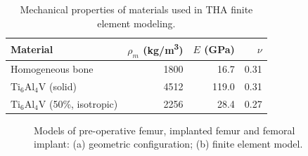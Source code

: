 \documentclass[12pt]{extbook}
\begin{document}
\begin{table}[htbp]
\centering
\caption{Mechanical properties of materials used in THA finite element modeling.}
\begin{tabular}{lrrr}
\hline\hline
Material & $\rho_m$ (kg/m\textsuperscript{3}) & $E$ (GPa) & $\nu$\\
\hline
Homogeneous bone & 1800 & 16.7 & 0.31\\
$\text{Ti}_6\text{Al}_4\text{V}$ (solid) & 4512 & 119.0 & 0.31\\
$\text{Ti}_6\text{Al}_4\text{V}$ (50\%, isotropic)& 2256 & 28.4 & 0.27\\
\hline\hline
\end{tabular}
\label{property_femur}
\end{table}

\begin{figure}[htbp]
\centering
{}
\caption{Models of pre-operative femur, implanted femur and femoral implant: (a) geometric configuration; (b) finite element model.}
\label{femur_model}
\end{figure}
\end{document}
